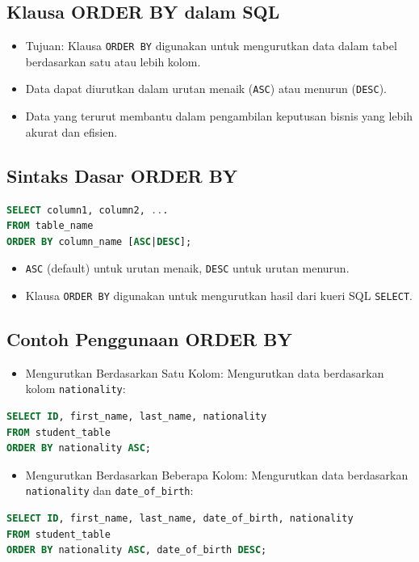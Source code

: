 \documentclass{article}
\begin{document}
\subsection{Klausa ORDER BY dalam SQL}
\begin{itemize}
    \item Tujuan: Klausa \texttt{ORDER BY} digunakan untuk mengurutkan data dalam tabel berdasarkan satu atau lebih kolom.
    \item Data dapat diurutkan dalam urutan menaik (\texttt{ASC}) atau menurun (\texttt{DESC}).
    \item Data yang terurut membantu dalam pengambilan keputusan bisnis yang lebih akurat dan efisien.
\end{itemize}

\subsection{Sintaks Dasar ORDER BY}
\begin{lstlisting}[language=SQL, caption={Sintaks Dasar ORDER BY}, captionpos=b]
SELECT column1, column2, ...
FROM table_name
ORDER BY column_name [ASC|DESC];    
\end{lstlisting}
\begin{itemize}
    \item \texttt{ASC} (default) untuk urutan menaik, \texttt{DESC} untuk urutan menurun.
    \item Klausa \texttt{ORDER BY} digunakan untuk mengurutkan hasil dari kueri SQL \texttt{SELECT}.
\end{itemize}

\subsection{Contoh Penggunaan ORDER BY}
\begin{itemize}
    \item Mengurutkan Berdasarkan Satu Kolom: Mengurutkan data berdasarkan kolom \texttt{nationality}:
\end{itemize}
\begin{lstlisting}[language=SQL, caption={ORDER BY Satu Kolom}, captionpos=b]
SELECT ID, first_name, last_name, nationality
FROM student_table
ORDER BY nationality ASC;
\end{lstlisting}
\begin{itemize}
    \item Mengurutkan Berdasarkan Beberapa Kolom: Mengurutkan data berdasarkan \texttt{nationality} dan \texttt{date\_of\_birth}:
\end{itemize}
\begin{lstlisting}[language=SQL, caption={ORDER BY Beberapa Kolom}, captionpos=b]
SELECT ID, first_name, last_name, date_of_birth, nationality
FROM student_table
ORDER BY nationality ASC, date_of_birth DESC;
\end{lstlisting}
\end{document}

